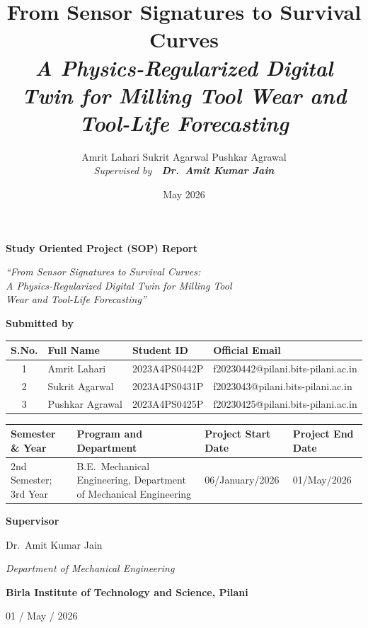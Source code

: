 \documentclass[11pt,a4paper]{article}
\title{\bfseries From Sensor Signatures to Survival Curves\\[0.25em]
  \large\itshape A Physics-Regularized Digital Twin for Milling Tool Wear and Tool-Life Forecasting}
\author{%
  \large Amrit Lahari \quad Sukrit Agarwal \quad Pushkar Agrawal \\[0.4em]
  \normalsize\itshape Supervised by\ \ \large\bfseries Dr.~Amit Kumar Jain}
\date{May 2026}
\begin{document}
\begin{titlepage}
  \thispagestyle{empty}
  \centering
  \vspace*{0.5cm}
  {\Large\bfseries Study Oriented Project (SOP) Report\par}
  \vspace{1.4cm}
  {\Large\itshape ``From Sensor Signatures to Survival Curves:\\[0.25em]
  A Physics-Regularized Digital Twin for Milling Tool\\[0.15em]
  Wear and Tool-Life Forecasting''\par}
  \vspace{1.4cm}

  {\large\bfseries Submitted by\par}
  \vspace{0.45cm}
  \renewcommand{\arraystretch}{1.35}
  \begin{tabular}{|c|p{4.4cm}|p{3.3cm}|p{5.4cm}|}
    \hline
    \textbf{S.No.} & \textbf{Full Name} & \textbf{Student ID} & \textbf{Official Email} \\
    \hline
    1 & Amrit Lahari    & 2023A4PS0442P & f20230442@pilani.bits-pilani.ac.in \\
    \hline
    2 & Sukrit Agarwal  & 2023A4PS0431P & f2023043@pilani.bits-pilani.ac.in \\
    \hline
    3 & Pushkar Agrawal & 2023A4PS0425P & f20230425@pilani.bits-pilani.ac.in \\
    \hline
  \end{tabular}
  \renewcommand{\arraystretch}{1.0}

  \vspace{1.0cm}
  \begin{tabular}{|p{4.0cm}|p{4.4cm}|p{3.0cm}|p{3.0cm}|}
    \hline
    \textbf{Semester \& Year} & \textbf{Program and Department} & \textbf{Project Start Date} & \textbf{Project End Date} \\
    \hline
    2nd Semester; 3rd Year & B.E.~Mechanical Engineering, Department of Mechanical Engineering & 06/January/2026 & 01/May/2026 \\
    \hline
  \end{tabular}

  \vspace{1.0cm}
  {\large\bfseries Supervisor\par}
  \vspace{0.25cm}
  {\large Dr.~Amit Kumar Jain\par}
  {\small\itshape Department of Mechanical Engineering\par}

  \vfill
  {\large\bfseries Birla Institute of Technology and Science, Pilani\par}
  \vspace{0.45cm}
  {\large 01 / May / 2026\par}
\end{titlepage}
\end{document}
